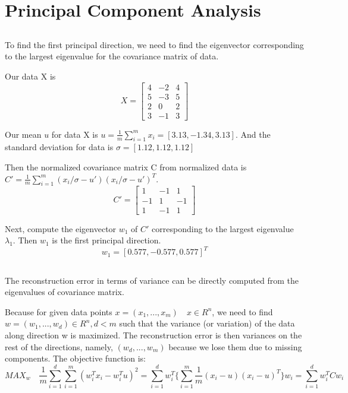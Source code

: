 \documentclass{article}
\begin{document}
\section{Principal Component Analysis}
\subsection{}
To find the first principal direction, we need to find the eigenvector corresponding to the largest eigenvalue for the covariance matrix of data.

Our data X is
$$
X =  
\begin{bmatrix}
4&-2&4\\
5&-3&5\\
2&0&2\\
3&-1&3
\end{bmatrix}
$$

Our mean $u$ for data X is $u = \frac{1}{m} \sum_{i=1}^m x_i = [ 3.13, -1.34, 3.13]$. And the standard deviation for data is $\sigma = [ 1.12, 1.12, 1.12]$

Then the normalized covariance matrix C from normalized data is $C' = \frac{1}{m} \sum_{i=1}^m (x_i / \sigma - u')(x_i / \sigma - u')^T$.
$$
C' =  
\begin{bmatrix}
1&-1&1\\
-1&1&-1\\
1&-1&1
\end{bmatrix}
$$

Next, compute the eigenvector $w_1$ of $C'$ corresponding to the largest eigenvalue $\lambda_1$. Then $w_1$ is the first principal direction.
$$
w_1 = [0.577, -0.577, 0.577]^T
$$

\subsection{}

The reconstruction error in terms of variance can be directly computed from the eigenvalues of covariance matrix.

Because for given data points $x = (x_1, ..., x_m) \quad x\in R^n$, we need to find $w = (w_1, ... ,w_d) \in R^n, d < m$ such that the variance (or variation) of the data along direction w is maximized. The reconstruction error is then variances on the rest of the directions, namely, $(w_d, ... ,w_m)$ because we lose them due to missing components. The objective function is: 
$$
MAX_{w} \quad \frac{1}{m} \sum_{i=1}^d \sum_{i=1}^m (w_i^T x_i - w_i^T u)^2
=\sum_{i=1}^d w_i^T \{ \sum_{i=1}^m \frac{1}{m}(x_i - u)(x_i - u)^T \} w_i = \sum_{i=1}^d w_i^T C w_i
$$
\end{document}
